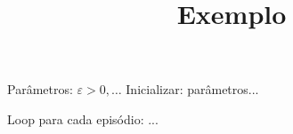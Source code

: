 \documentclass[brazilian,preview]{standalone}
\title{Exemplo}
\begin{document}
\begin{algorithm}
Parâmetros: $\varepsilon > 0, \dots$
Inicializar:
    parâmetros...

Loop para cada episódio:
    ...
\end{algorithm}
\end{document}
